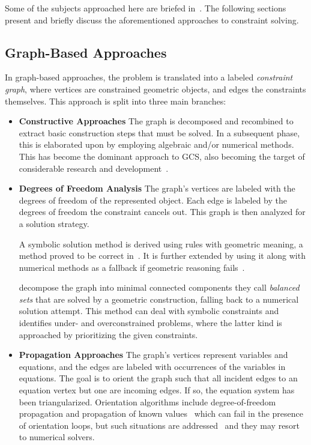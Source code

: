 Some of the subjects approached here are briefed in~\cite{Hoffmann:2005:BCS}.
The following sections present and briefly discuss the aforementioned approaches
to constraint solving.

\subsection{Graph-Based Approaches}%
\label{sec:intro.constraints.graph}

In graph-based approaches, the problem is translated into a labeled
\textit{constraint graph}, where vertices are constrained geometric objects, and
edges the constraints themselves.  This approach is split into three main
branches:

\begin{itemize}
  \item[] \textbf{Constructive Approaches} The graph is decomposed and
  recombined to extract basic construction steps that must be solved.  In a
  subsequent phase, this is elaborated upon by employing algebraic and/or
  numerical methods.  This has become the dominant approach to \ac{GCS}, also
  becoming the target of considerable research and
  development~\cite{Bettig:2011:GCSPC}.

  \item[] \textbf{Degrees of Freedom Analysis} The graph's vertices are labeled
  with the degrees of freedom of the represented object.  Each edge is labeled
  by the degrees of freedom the constraint cancels out.  This graph is then
  analyzed for a solution strategy.

  A symbolic solution method is derived using rules with geometric meaning, a
  method proved to be correct in~\cite{Kramer:1990:SGCS}.  It is further
  extended by using it along with numerical methods as a fallback if geometric
  reasoning fails~\cite{Hsu:1997:HCSEIGC}.

   decompose the graph into minimal connected components
  they call \textit{balanced sets} that are solved by a geometric construction,
  falling back to a numerical solution attempt.  This method can deal with
  symbolic constraints and identifies under- and overconstrained problems, where
  the latter kind is approached by prioritizing the given constraints.

  \item[] \textbf{Propagation Approaches} The graph's vertices represent
  variables and equations, and the edges are labeled with occurrences of the
  variables in equations.  The goal is to orient the graph such that all
  incident edges to an equation vertex but one are incoming edges.  If so, the
  equation system has been triangularized.  Orientation algorithms include
  degree-of-freedom propagation and propagation of known
  values~\cite{Freeman:1990:ICS,Veltkamp:1992:Geometric} which can fail in the
  presence of orientation loops, but such situations are
  addressed~\cite{Veltkamp:1992:Geometric} and they may resort to numerical
  solvers.
\end{itemize}


